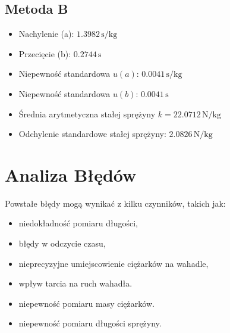 \documentclass[12pt]{article}
\begin{document}
\subsection*{Metoda B}

\begin{itemize}
    \item Nachylenie (a): \( 1.3982 \, \text{s/kg} \)
    \item Przecięcie (b): \( 0.2744 \, \text{s} \)
    \item Niepewność standardowa \( u(a) \): \( 0.0041 \, \text{s/kg} \)
    \item Niepewność standardowa \( u(b) \): \( 0.0041 \, \text{s} \)
    \item Średnia arytmetyczna stałej sprężyny \( k = 22.0712 \, \text{N/kg} \)
    \item Odchylenie standardowe stałej sprężyny: \( 2.0826 \, \text{N/kg} \)
\end{itemize}
\section*{Analiza Błędów}
Powstałe błędy mogą wynikać z kilku czynników, takich jak:
\begin{itemize}
    \item niedokładność pomiaru długości,
    \item błędy w odczycie czasu,
    \item nieprecyzyjne umiejscowienie ciężarków na wahadle,
    \item wpływ tarcia na ruch wahadła.
    \item niepewność pomiaru masy ciężarków.
    \item niepewność pomiaru długości sprężyny.
\end{itemize}
\end{document}

